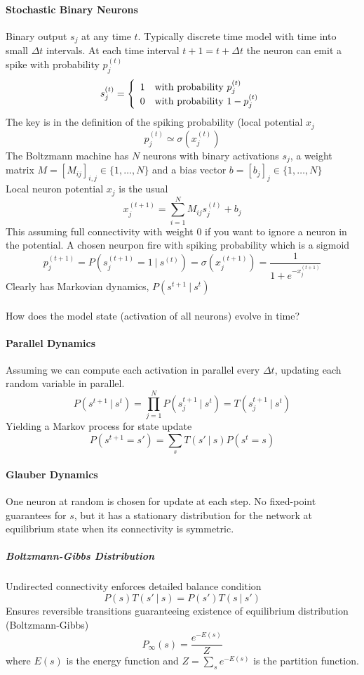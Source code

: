\documentclass[10pt]{report}
\begin{document}
\paragraph{Stochastic Binary Neurons} Binary output $s_j$ at any time $t$. Typically discrete time model with time into small $\Delta t$ intervals. At each time interval $t+1 = t+\Delta t$ the neuron can emit a spike with probability $p_j^{(t)}$ $$s_j^{(t)} = \left\{\begin{array}{c l}
1&\text{with probability }p_j^{(t)}\\
0&\text{with probability }1-p_j^{(t)}
\end{array}\right.$$
The key is in the definition of the spiking probability (local potential $x_j$ $$p_j^{(t)} \simeq \sigma(x_j^{(t)})$$
The Boltzmann machine has $N$ neurons with binary activations $s_j$, a weight matrix $M = [M_{ij}]_{i,j} \in \{1,\ldots,N\}$ and a bias vector $b = [b_j]_j\in\{1,\ldots,N\}$\\
Local neuron potential $x_j$ is the usual $$x_j^{(t+1)} = \sum_{i=1}^N M_{ij}s_j^{(t)} +b_j$$
This assuming full connectivity with weight $0$ if you want to ignore a neuron in the potential. A chosen neurpon fire with spiking probability which is a sigmoid $$p_j^{(t+1)} = P(s_j^{(t+1)} = 1\:|\:s^{(t)}) = \sigma(x_j^{(t+1)}) = \frac{1}{1+e^{-x_j^{(t+1)}}}$$
Clearly has Markovian dynamics, $P(s^{t+1}\:|\:s^t)$\\\\
How does the model state (activation of all neurons) evolve in time?
\paragraph{Parallel Dynamics} Assuming we can compute each activation in parallel every $\Delta t$, updating each random variable in parallel. $$P(s^{t+1}\:|\:s^t) = \prod_{j=1}^N P(s_j^{t+1}\:|\:s^t) = T(s_j^{t+1}\:|\:s^t)$$
Yielding a Markov process for state update
$$P(s^{t+1} = s') = \sum_s T(s'\:|\:s)P(s^t = s)$$
\paragraph{Glauber Dynamics} One neuron at random is chosen for update at each step. No fixed-point guarantees for $s$, but it has a stationary distribution for the network at equilibrium state when its connectivity is symmetric.
\subparagraph{Boltzmann-Gibbs Distribution} Undirected connectivity enforces detailed balance condition $$P(s)T(s'\:|\:s) = P(s')T(s\:|\:s')$$
Ensures reversible transitions guaranteeing existence of equilibrium distribution (Boltzmann-Gibbs) $$P_\infty(s) = \frac{e^{-E(s)}}{Z}$$
where $E(s)$ is the energy function and $Z = \sum_se^{-E(s)}$ is the partition function.
\end{document}
